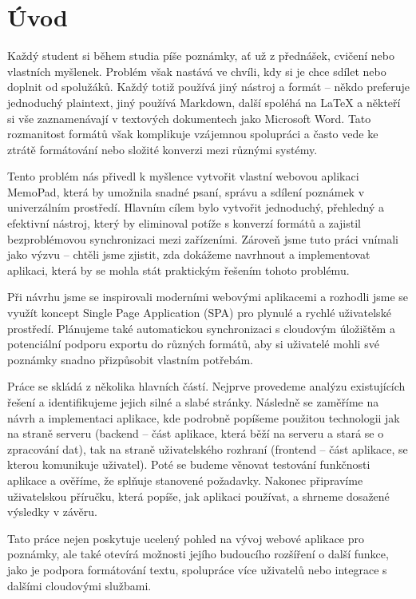 \section{Úvod}

Každý student si během studia píše poznámky, ať už z přednášek, cvičení nebo vlastních myšlenek. Problém však nastává ve chvíli, kdy si je chce sdílet nebo doplnit od spolužáků. Každý totiž používá jiný nástroj a formát -- někdo preferuje jednoduchý plaintext, jiný používá Markdown, další spoléhá na LaTeX a někteří si vše zaznamenávají v textových dokumentech jako Microsoft Word. Tato rozmanitost formátů však komplikuje vzájemnou spolupráci a často vede ke ztrátě formátování nebo složité konverzi mezi různými systémy.

Tento problém nás přivedl k myšlence vytvořit vlastní webovou aplikaci MemoPad, která by umožnila snadné psaní, správu a sdílení poznámek v univerzálním prostředí. Hlavním cílem bylo vytvořit jednoduchý, přehledný a efektivní nástroj, který by eliminoval potíže s konverzí formátů a zajistil bezproblémovou synchronizaci mezi zařízeními. Zároveň jsme tuto práci vnímali jako výzvu -- chtěli jsme zjistit, zda dokážeme navrhnout a implementovat aplikaci, která by se mohla stát praktickým řešením tohoto problému.

Při návrhu jsme se inspirovali moderními webovými aplikacemi a rozhodli jsme se využít koncept Single Page Application (SPA) pro plynulé a rychlé uživatelské prostředí. Plánujeme také automatickou synchronizaci s cloudovým úložištěm a potenciální podporu exportu do různých formátů, aby si uživatelé mohli své poznámky snadno přizpůsobit vlastním potřebám.

Práce se skládá z několika hlavních částí. Nejprve provedeme analýzu existujících řešení a identifikujeme jejich silné a slabé stránky. Následně se zaměříme na návrh a implementaci aplikace, kde podrobně popíšeme použitou technologii jak na straně serveru (backend -- část aplikace, která běží na serveru a stará se o zpracování dat), tak na straně uživatelského rozhraní (frontend -- část aplikace, se kterou komunikuje uživatel). Poté se budeme věnovat testování funkčnosti aplikace a ověříme, že splňuje stanovené požadavky. Nakonec připravíme uživatelskou příručku, která popíše, jak aplikaci používat, a shrneme dosažené výsledky v závěru.

Tato práce nejen poskytuje ucelený pohled na vývoj webové aplikace pro poznámky, ale také otevírá možnosti jejího budoucího rozšíření o další funkce, jako je podpora formátování textu, spolupráce více uživatelů nebo integrace s dalšími cloudovými službami.
